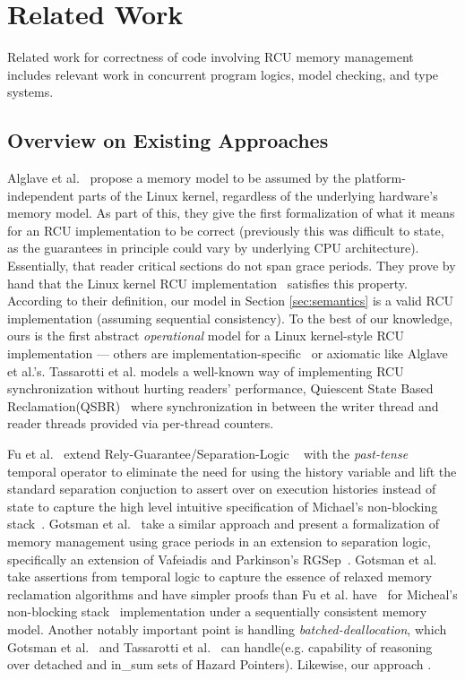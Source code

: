\section{Related Work}
\label{sec:relatedwork}
Related work for correctness of code involving RCU memory management includes relevant work in concurrent program logics, model checking, and type systems.
\subsection{Overview on Existing Approaches}
Alglave et al.~\cite{Alglave:2018:FSC:3173162.3177156} propose a memory model to be assumed by the platform-independent parts of the Linux kernel, regardless of the underlying hardware's memory model.
As part of this, they give the first formalization of what it means for an RCU implementation to be correct (previously this was difficult to state, as the guarantees in principle could vary by underlying CPU architecture). Essentially, that reader critical sections do not span grace periods.  They prove by hand that the Linux kernel RCU implementation~\cite{DBLP:conf/cav/AlglaveKT13,abssem} satisfies this property. 
According to their definition, our model in Section \ref{sec:semantics} is a valid RCU implementation (assuming sequential consistency).
To the best of our knowledge, ours is the first abstract \emph{operational} model for a Linux kernel-style RCU implementation --- others are implementation-specific~\cite{Mandrykin:2016:TDV:3001219.3001297} or axiomatic like Alglave et al.'s. Tassarotti et al. models a well-known way of implementing RCU synchronization without hurting readers' performance, \textsf{Quiescent State Based Reclamation}(QSBR)~\cite{urcu_ieee} where synchronization in between the writer thread and reader threads provided via per-thread counters. 

 Fu et al.~\cite{shao_temp} extend Rely-Guarantee/Separation-Logic ~\cite{vafeiadis07,Feng:2007:RCS:1762174.1762193,Feng:2009:LRR:1480881.1480922} with the \textit{past-tense} temporal operator to eliminate the need for using the history variable and lift the standard separation conjuction to assert over on execution histories instead of state to capture the high level intuitive specification of Michael's non-blocking stack~\cite{Michael:2004:HPS:987524.987595}. Gotsman et al.~\cite{Gotsman:2013:VCM:2450268.2450289} take a similar approach and present a formalization of memory management using grace periods in an extension to separation logic, specifically an extension of Vafeiadis and Parkinson's \textsf{RGSep}~\cite{vafeiadis07}. Gotsman et al. take assertions from temporal logic to capture the essence of relaxed memory reclamation algorithms and have simpler proofs than Fu et al. have~\cite{shao_temp} for Micheal's non-blocking stack~\cite{Michael:2004:HPS:987524.987595} implementation under a sequentially consistent memory model. Another notably important point is handling \textit{batched-deallocation}, which Gotsman et al.~\cite{Gotsman:2013:VCM:2450268.2450289} and Tassarotti et al.~\cite{verrcu} can handle(e.g. capability of reasoning over \textsf{detached} and \textsf{in\_sum} sets of Hazard Pointers). Likewise, our approach .

